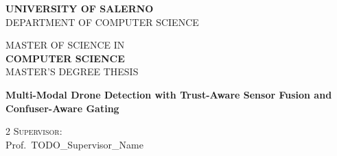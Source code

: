 \documentclass[12pt,a4paper,oneside,openright]{book}
\begin{document}

\begin{titlepage}

\begin{center}
    \large{\textbf{UNIVERSITY OF SALERNO}}
    \vspace{3mm}
    \\ \large{DEPARTMENT OF COMPUTER SCIENCE}
    \vspace{5mm}
\end{center}


\begin{center}
    \vspace{2mm}
    \large{MASTER OF SCIENCE IN}
    \\  \large{\textbf{COMPUTER SCIENCE}}
    \vspace{4mm}
    \\ \normalsize{MASTER'S DEGREE THESIS}
    \vspace{10mm}
\end{center}

\vspace{10mm}
\begin{center}
    \LARGE{\textbf{Multi-Modal Drone Detection with Trust-Aware Sensor Fusion and Confuser-Aware Gating}}
\end{center}

\vspace*{\fill}

\begin{minipage}[t]{1\textwidth}
    \begin{multicols}{2}
        {\normalsize{\textsc{Supervisor:}}{\normalsize\vspace{2mm}
        \\ \normalsize{Prof.\ TODO\_Supervisor\_Name}}} \\


         \columnbreak


\end{multicols}
\end{minipage}
\end{titlepage}
\end{document}
